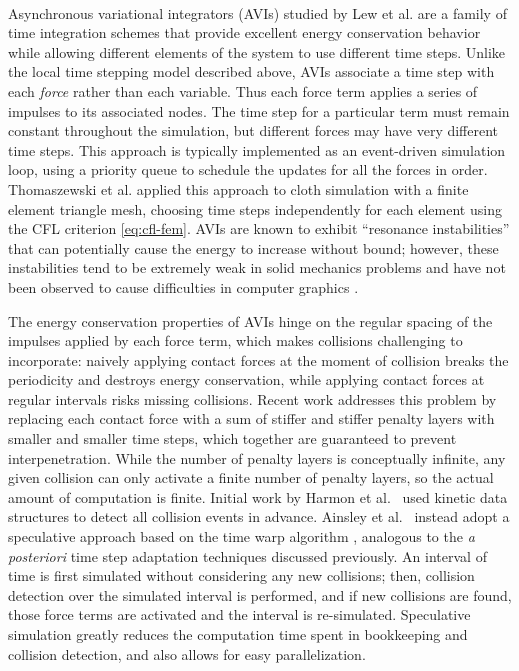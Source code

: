 \paragraph*{}
Asynchronous variational integrators (AVIs) studied by Lew et al. \cite{Lew2004} are a family of time integration schemes that provide excellent energy conservation behavior while allowing different elements of the system to use different time steps.
Unlike the local time stepping model described above, AVIs associate a time step with each \emph{force} rather than each variable.
Thus each force term applies a series of impulses to its associated nodes.
The time step for a particular term must remain constant throughout the simulation, but different forces may have very different time steps.
This approach is typically implemented as an event-driven simulation loop, using a priority queue to schedule the updates for all the forces in order.
Thomaszewski et al. \cite{Thomaszewski2008} applied this approach to cloth simulation with a finite element triangle mesh, choosing time steps independently for each element using the CFL criterion \eqref{eq:cfl-fem}.
AVIs are known to exhibit ``resonance instabilities'' that can potentially cause the energy to increase without bound; however, these instabilities tend to be extremely weak in solid mechanics problems \cite{Fong2007} and have not been observed to cause difficulties in computer graphics \cite{Harmon2009}.

The energy conservation properties of AVIs hinge on the regular spacing of the impulses applied by each force term, which makes collisions challenging to incorporate: naively applying contact forces at the moment of collision breaks the periodicity and destroys energy conservation, while applying contact forces at regular intervals risks missing collisions.
Recent work \cite{Harmon2009,Ainsley2012} addresses this problem by replacing each contact force with a sum of stiffer and stiffer penalty layers with smaller and smaller time steps, which together are guaranteed to prevent interpenetration.
While the number of penalty layers is conceptually infinite, any given collision can only activate a finite number of penalty layers, so the actual amount of computation is finite.
Initial work by Harmon et al.~\cite{Harmon2009} used kinetic data structures to detect all collision events in advance.
Ainsley et al.~\cite{Ainsley2012} instead adopt a speculative approach based on the time warp algorithm \cite{Jefferson1985, Mirtich2000}, analogous to the \textit{a posteriori} time step adaptation techniques discussed previously.
An interval of time is first simulated without considering any new collisions; then, collision detection over the simulated interval is performed, and if new collisions are found, those force terms are activated and the interval is re-simulated.
Speculative simulation greatly reduces the computation time spent in bookkeeping and collision detection, and also allows for easy parallelization.

